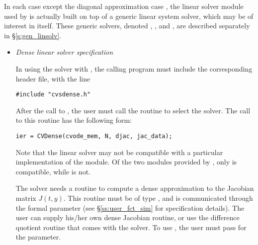 In each case except the diagonal approximation case {\cvdiag}, the linear
solver module used by {\cvodes} is actually built on top of a generic
linear system solver, which may be of interest in itself.  These
generic solvers, denoted {\dense}, {\band}, and {\spgmr}, are described
separately in \S\ref{s:gen_linsolv}.
%
\begin{itemize}
%
%
\item {\em Dense linear solver specification} 

  In using the {\cvdense} solver with {\cvodes}, the calling program must
  include the corresponding header file, with the line
\begin{verbatim}
#include "cvsdense.h"
\end{verbatim}
  \par After the call to , the user must call the routine 
  to select the {\cvdense} solver. The call to this routine has the following form:
\begin{verbatim}
ier = CVDense(cvode_mem, N, djac, jac_data);
\end{verbatim}

  Note that the {\cvdense} linear solver may not be compatible with a particular
  implementation of the {\nvector} module. Of the two {\nvector} modules 
  provided by {\sundials}, only {\nvecs} is compatible, while {\nvecp} is not.

  The 
  {\cvdense} solver needs a routine to compute a dense approximation to
  the Jacobian matrix $J(t,y)$.  This routine must be of type
  , and is communicated through the  
  formal parameter  (see \S\ref{ss:user_fct_sim} for specification
  details).  The user can supply his/her own dense
  Jacobian routine, or use the difference quotient routine  
  that comes with the {\cvdense} solver.  To use , the user 
  must pass  for the  parameter.
  

\end{itemize}
